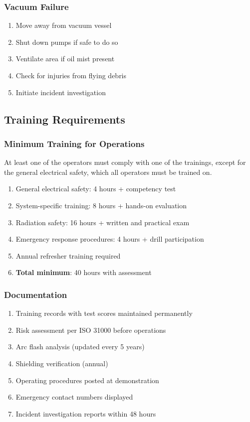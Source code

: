 \subsubsection{Vacuum Failure}
\begin{enumerate}[noitemsep]
    \item Move away from vacuum vessel
    \item Shut down pumps if safe to do so
    \item Ventilate area if oil mist present
    \item Check for injuries from flying debris
    \item Initiate incident investigation
\end{enumerate}

\subsection{Training Requirements}

\subsubsection{Minimum Training for Operations}
At least one of the operators must comply with one of the trainings, except for the general electrical safety, which all operators must be trained on.
\begin{enumerate}[noitemsep]
    \item General electrical safety: 4 hours + competency test
    \item System-specific training: 8 hours + hands-on evaluation
    \item Radiation safety: 16 hours + written and practical exam
    \item Emergency response procedures: 4 hours + drill participation
    \item Annual refresher training required
    \item \textbf{Total minimum}: 40 hours with assessment
\end{enumerate}

\subsubsection{Documentation}
\begin{enumerate}[noitemsep]
    \item Training records with test scores maintained permanently
    \item Risk assessment per ISO 31000 before operations
    \item Arc flash analysis (updated every 5 years)
    \item Shielding verification (annual)
    \item Operating procedures posted at demonstration
    \item Emergency contact numbers displayed
    \item Incident investigation reports within 48 hours
\end{enumerate}

